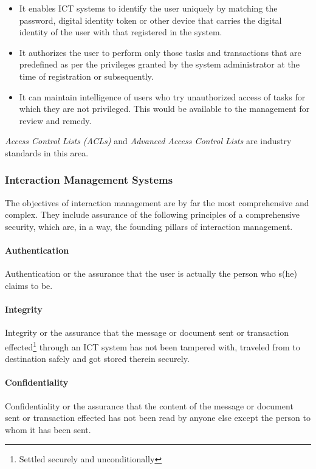  \begin{itemize}
 	\item It enables ICT systems to identify the user uniquely by matching the password, digital identity token or other device that carries the digital identity of the user with that registered in the system.
 	
 	\item It authorizes the user to perform only those tasks and transactions that are
 	predefined as per the privileges granted by the system administrator at the time
 	of registration or subsequently.
 	
 	\item It can maintain intelligence of users who try unauthorized access of tasks for
 	which they are not privileged. This would be available to the management for
 	review and remedy.
 \end{itemize}

\textit{Access Control Lists (ACLs)} and \textit{Advanced Access Control Lists} are industry
standards in this area.
 
 
 \subsubsection*{Interaction Management Systems}
 The objectives of interaction management are by far the most comprehensive and complex.
 They include assurance of the following principles of a comprehensive security, which are,
 in a way, the founding pillars of interaction management.
 
 \paragraph*{Authentication}
 Authentication or the assurance that the user is actually the person who s(he) claims to be.
 
 \paragraph*{Integrity} 
  Integrity or the assurance that the message or document sent or transaction effected\footnote{Settled securely and unconditionally} through an ICT system has not been tampered with, traveled from to destination safely and got stored therein securely.
  
  
  \paragraph*{Confidentiality}
  Confidentiality or the assurance that the content of the message or document sent
  or transaction effected has not been read by anyone else except the person to
  whom it has been sent.
  
